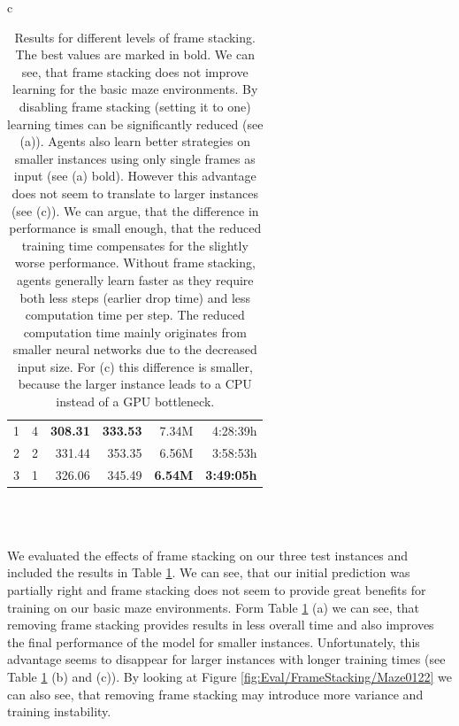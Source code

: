 \begin{table}[htp]
\begin{center}
\begin{tabular}{c}
\begin{tabular}{rcrrrr}
                \midrule
                1 & 4 & \textbf{308.31} & \textbf{333.53} & 7.34M & 4:28:39h \\
                2 & 2 & 331.44 & 353.35 & 6.56M & 3:58:53h \\
                3 & 1 & 326.06 & 345.49 & \textbf{6.54M} & \textbf{3:49:05h} \\
                \bottomrule
            \end{tabular} \\
             \\
        \end{tabular}
        
    \end{center}
    \caption[Evaluation Results for Different Levels of Frame Stacking]{Results for different levels of frame stacking. The best values are marked in bold. We can see, that frame stacking does not improve learning for the basic maze environments. By disabling frame stacking (setting it to one) learning times can be significantly reduced (see (a)). Agents also learn better strategies on smaller instances using only single frames as input (see (a) bold). However this advantage does not seem to translate to larger instances (see (c)). We can argue, that the difference in performance is small enough, that the reduced training time compensates for the slightly worse performance. Without frame stacking, agents generally learn faster as they require both less steps (earlier drop time) and less computation time per step. The reduced computation time mainly originates from smaller neural networks due to the decreased input size. For (c) this difference is smaller, because the larger instance leads to a CPU instead of a GPU bottleneck.} \label{tab:Eval/FrameStacking}
\end{table}

We evaluated the effects of frame stacking on our three test instances and included the results  in Table \ref{tab:Eval/FrameStacking}. We can see, that our initial prediction was partially right and frame stacking does not seem to provide great benefits for training on our basic maze environments. Form Table \ref{tab:Eval/FrameStacking} (a) we can see, that removing frame stacking provides results in less overall time and also improves the final performance of the model for smaller instances. Unfortunately, this advantage seems to disappear for larger instances with longer training times (see Table \ref{tab:Eval/FrameStacking} (b) and (c)). By looking at Figure \ref{fig:Eval/FrameStacking/Maze0122} we can also see, that removing frame stacking may introduce more variance and training instability. 

